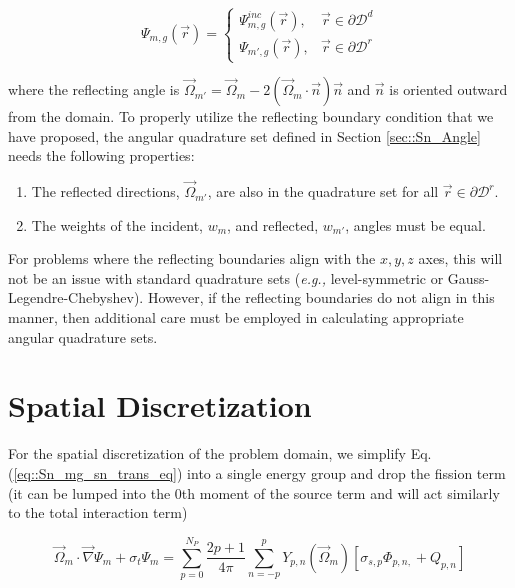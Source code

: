 \begin{equation}
\label{eq::Sn_simple_BC}
\Psi_{m,g} (\vec{r}) = \begin{cases}
	\Psi^{inc}_{m,g} (\vec{r}) , & \vec{r} \in \partial \mathcal{D}^d \\
	\Psi_{m',g} (\vec{r}) , & \vec{r} \in \partial \mathcal{D}^r
\end{cases}
\end{equation}

\noindent where the reflecting angle is $\vec{\Omega}_{m'} = \vec{\Omega}_{m} - 2 \left(  \vec{\Omega}_{m} \cdot \vec{n} \right) \vec{n}$ and $\vec{n}$ is oriented outward from the domain. To properly utilize the reflecting boundary condition that we have proposed, the angular quadrature set defined in Section \ref{sec::Sn_Angle} needs the following properties:

\begin{enumerate}
 	\item The reflected directions, $\vec{\Omega}_{m'}$, are also in the quadrature set for all $\vec{r} \in \partial \mathcal{D}^r$.
	\item The weights of the incident, $w_m$, and reflected, $w_{m'}$, angles must be equal.
\end{enumerate} 

\noindent For problems where the reflecting boundaries align with the $x,y,z$ axes, this will not be an issue with standard quadrature sets ({\em e.g.,} level-symmetric or Gauss-Legendre-Chebyshev). However, if the reflecting boundaries do not align in this manner, then additional care must be employed in calculating appropriate angular quadrature sets.

\section{Spatial Discretization}
\label{sec::Sn_Spatial}

For the spatial discretization of the problem domain, we simplify Eq. (\ref{eq::Sn_mg_sn_trans_eq}) into a single energy group and drop the fission term (it can be lumped into the 0th moment of the source term and will act similarly to the total interaction term)

\begin{equation}
\label{eq::Sn_trans_eq_simple_no_energy_groups}
\vec{\Omega}_m \cdot \vec{\nabla} \Psi_{m}  + \sigma_{t}   \Psi_{m}=  \sum_{p=0}^{N_P} \frac{2p + 1}{4 \pi}    \sum_{n=-p}^{p}  Y_{p,n} (  \vec{\Omega}_m ) \left[ \sigma_{s,p}  \Phi_{p,n,}  + Q_{p,n} \right]
\end{equation}

